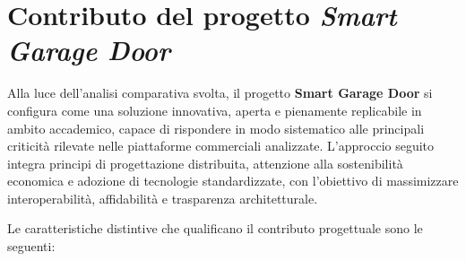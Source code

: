 \section{Contributo del progetto \textit{Smart Garage Door}}

Alla luce dell’analisi comparativa svolta, il progetto \textbf{Smart Garage Door} si configura come una soluzione innovativa, aperta e pienamente replicabile in ambito accademico, capace di rispondere in modo sistematico alle principali criticità rilevate nelle piattaforme commerciali analizzate.
L’approccio seguito integra principi di progettazione distribuita, attenzione alla sostenibilità economica e adozione di tecnologie standardizzate, con l’obiettivo di massimizzare interoperabilità, affidabilità e trasparenza architetturale.

Le caratteristiche distintive che qualificano il contributo progettuale sono le seguenti:

